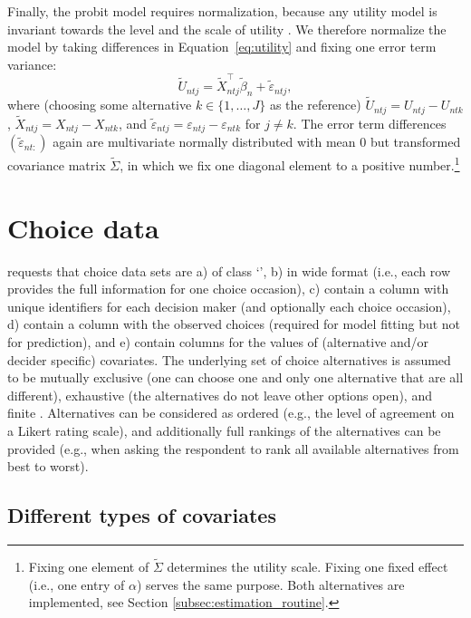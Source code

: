\documentclass[article,shortnames]{jss}
\newcommand{\class}[1]{`\code{#1}'}
\begin{document}
Finally, the probit model requires normalization, because any utility model is invariant towards the level and the scale of utility \citep[Ch.\ 2]{Train:2009}. We therefore normalize the model by taking differences in Equation~\ref{eq:utility} and fixing one error term variance:
%
\begin{equation}
\label{eq:utility_diff}
\tilde{U}_{ntj} = \tilde{X}_{ntj}^\top \tilde{\beta}_n + \tilde{\varepsilon}_{ntj},
\end{equation}
%
where (choosing some alternative $k \in \{1,\dots,J\}$ as the reference) $\tilde{U}_{ntj} = U_{ntj} - U_{ntk}$, $\tilde{X}_{ntj} = X_{ntj} - X_{ntk}$, and $\tilde{\varepsilon}_{ntj} = \varepsilon_{ntj} - \varepsilon_{ntk}$ for $j\neq k$. The error term differences $(\tilde{\varepsilon}_{nt:})$ again are multivariate normally distributed with mean 0 but transformed covariance matrix $\tilde{\Sigma}$, in which we fix one diagonal element to a positive number.\footnote{Fixing one element of $\tilde{\Sigma}$ determines the utility scale. Fixing one fixed effect (i.e., one entry of $\alpha$) serves the same purpose. Both alternatives are implemented, see Section \ref{subsec:estimation_routine}.}

\section{Choice data} \label{sec:choice_data}

 requests that choice data sets are a) of class \class{data.frame}, b) in wide format (i.e., each row provides the full information for one choice occasion), c) contain a column with unique identifiers for each decision maker (and optionally each choice occasion), d) contain a column with the observed choices (required for model fitting but not for prediction), and e) contain columns for the values of (alternative and/or decider specific) covariates. The underlying set of choice alternatives is assumed to be mutually exclusive (one can choose one and only one alternative that are all different), exhaustive (the alternatives do not leave other options open), and finite \citep[Ch.\ 2]{Train:2009}. Alternatives can be considered as ordered (e.g., the level of agreement on a Likert rating scale), and additionally full rankings of the alternatives can be provided (e.g., when asking the respondent to rank all available alternatives from best to worst).

\subsection{Different types of covariates} \label{subsec:covariate_types}
\end{document}
